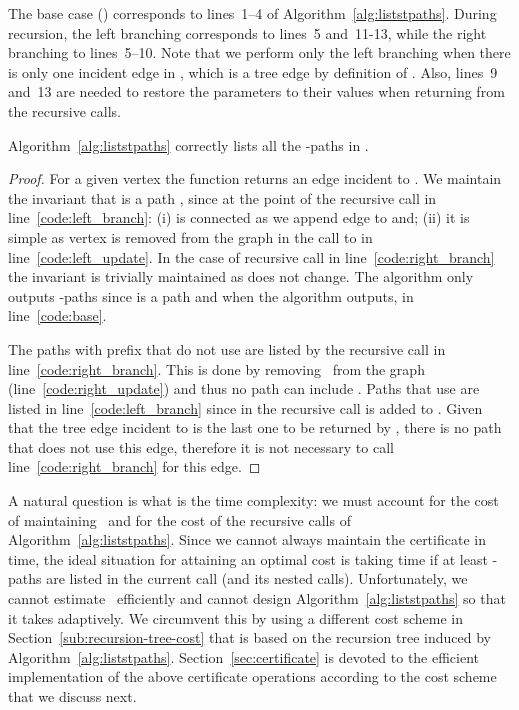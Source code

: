 The base case () corresponds to lines~1--4 of
Algorithm~\ref{alg:liststpaths}. During recursion, the left branching
corresponds to lines~5 and~11-13, while the right branching to
lines~5--10. Note that we perform only the left branching when there is
only one incident edge in , which is a tree edge by definition of
. Also, lines~9 and~13 are needed to restore the
parameters to their values when returning from the recursive
calls.

\begin{lemma}
  \label{lemma:correctness_algo_listpaths}
Algorithm~\ref{alg:liststpaths} correctly lists all the -paths in
  .
\end{lemma}
\begin{proof}
  For a given vertex  the function  returns an
  edge  incident to . We maintain the invariant that  is
  a path , since at the point of the recursive call in
  line~\ref{code:left_branch}: (i) is connected as we append edge
   to  and; (ii) it is simple as vertex  is removed
  from the graph  in the call to  in
  line~\ref{code:left_update}. In the case of recursive call in
  line~\ref{code:right_branch} the invariant is trivially maintained
  as  does not change.
The algorithm only outputs -paths since  is
  a  path and  when the algorithm outputs, in
  line~\ref{code:base}. 

  The paths with prefix  that do not use  are listed by
  the recursive call in line~\ref{code:right_branch}. This is done by
  removing~ from the graph (line~\ref{code:right_update}) and thus
  no path can include . Paths that use  are listed in
  line~\ref{code:left_branch} since in the recursive call  is added
  to . Given that the tree edge incident to  is the last one
  to be returned by , there is no path that does not
  use this edge, therefore it is not necessary to call
  line~\ref{code:right_branch} for this edge.
\end{proof}

A natural question is what is the time complexity: we must account for
the cost of maintaining~ and for the cost of the recursive calls of
Algorithm~\ref{alg:liststpaths}. Since we cannot always maintain the
certificate in  time, the ideal situation for attaining an
optimal cost is taking  time if at least  -paths are
listed in the current call (and its nested calls). Unfortunately, we
cannot estimate~ efficiently and cannot design
Algorithm~\ref{alg:liststpaths} so that it takes  adaptively.
We circumvent this by using a different cost scheme in
Section~\ref{sub:recursion-tree-cost} that is based on the recursion
tree induced by Algorithm~\ref{alg:liststpaths}.
Section~\ref{sec:certificate} is devoted to the efficient
implementation of the above certificate operations according to the
cost scheme that we discuss next.


